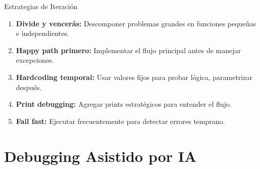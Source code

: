 \documentclass[aspectratio=169]{beamer}
\begin{document}
\begin{frame}{Estrategias de Iteración}
    \begin{enumerate}
        \setlength\itemsep{0.8em}
        \item \textbf{Divide y vencerás:} Descomponer problemas grandes en funciones pequeñas e independientes.
        
        \item \textbf{Happy path primero:} Implementar el flujo principal antes de manejar excepciones.
        
        \item \textbf{Hardcoding temporal:} Usar valores fijos para probar lógica, parametrizar después.
        
        \item \textbf{Print debugging:} Agregar prints estratégicos para entender el flujo.
        
        \item \textbf{Fail fast:} Ejecutar frecuentemente para detectar errores temprano.
    \end{enumerate}
\end{frame}

\section{Debugging Asistido por IA}
\end{document}
